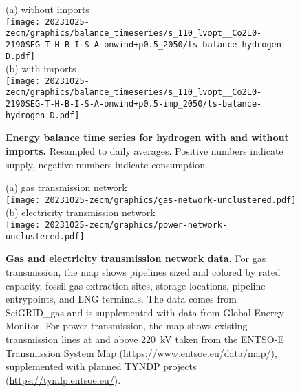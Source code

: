 \begin{figure*}
    \centering
    \footnotesize
    (a) without imports \\
    \texttt{[image: 20231025-zecm/graphics/balance\_timeseries/s\_110\_lvopt\_\_Co2L0-2190SEG-T-H-B-I-S-A-onwind+p0.5\_2050/ts-balance-hydrogen-D.pdf]} \\
    (b) with imports \\
    \texttt{[image: 20231025-zecm/graphics/balance\_timeseries/s\_110\_lvopt\_\_Co2L0-2190SEG-T-H-B-I-S-A-onwind+p0.5-imp\_2050/ts-balance-hydrogen-D.pdf]}
    \caption{\textbf{Energy balance time series for hydrogen with and without imports.} Resampled to daily averages. Positive numbers indicate supply, negative numbers indicate consumption.}
    \label{fig:si:balance-h2}
\end{figure*}

\begin{figure*}
    \centering
    \footnotesize
    (a) gas transmission network \\
    \texttt{[image: 20231025-zecm/graphics/gas-network-unclustered.pdf]} \\
    (b) electricity transmission network \\
    \texttt{[image: 20231025-zecm/graphics/power-network-unclustered.pdf]}
    \caption{\textbf{Gas and electricity transmission network data.} For gas
    transmission, the map shows pipelines sized and colored by rated capacity,
    fossil gas extraction sites, storage locations, pipeline entrypoints, and
    LNG terminals. The data comes from SciGRID\_gas and is supplemented with
    data from Global Energy Monitor. For power transmission, the map shows
    existing transmission lines at and above 220~kV taken from the ENTSO-E
    Transmission System Map (\url{https://www.entsoe.eu/data/map/}),
    supplemented with planned TYNDP projects (\url{https://tyndp.entsoe.eu/}).}
    \label{fig:si:networks-raw}
\end{figure*}
